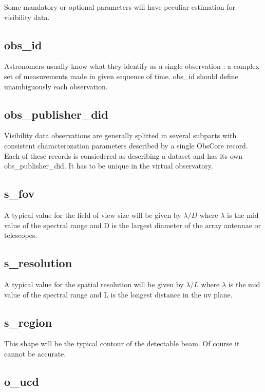 \documentclass[11pt,a4paper]{ivoa}
\begin{document}
Some mandatory or optional parameters will have peculiar estimation for visibility data.

\subsection{obs\_id}

Astronomers usually know what they identify as a single observation : a complex set of measurements made in given sequence of time. obs\_id should define unambiguously each observation.

\subsection{obs\_publisher\_did}

Visibility data observations are generally splitted in several subparts with consistent characterozation parameters described by a single ObsCore record. Each of these records is consiedered as describing a dataset and has its own obs\_publisher\_did. It has to be unique in the virtual observatory.

\subsection{s\_fov}
\label{sec:fov}

A typical value for the field of view size will be given by $\lambda / D$ where $\lambda$ is the mid value of the spectral range and D is the largest diameter of the array antennae or telescopes.
 
\subsection{s\_resolution}
\label{sec:res}

A typical value for the spatial resolution will be given by $\lambda / L$ where $\lambda$ is the mid value of the spectral range and L is the longest distance in the uv plane. 

\subsection{s\_region}

This shape will be the typical contour of the detectable beam. Of course it cannot be accurate. 

\subsection{o\_ucd}
\end{document}
